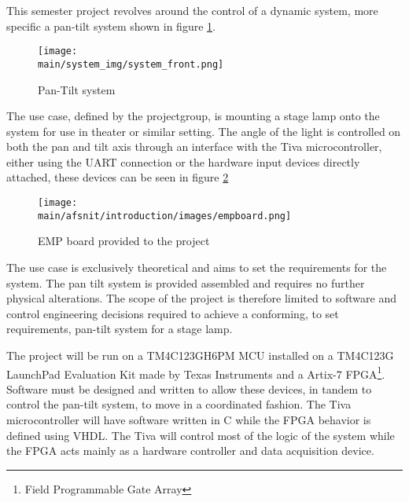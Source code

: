 \documentclass[../../main]{subfiles}
\begin{document}
This semester project revolves around the control of a dynamic system, more specific a pan-tilt  system shown in figure \ref{fig:system}.

\begin{figure}[H]
\centering
\texttt{[image: \\main/system\_img/system\_front.png]}
\caption{Pan-Tilt system}
\label{fig:system}
\end{figure}

The use case, defined by the projectgroup, is mounting a stage lamp onto the system for use in theater or similar setting.
The angle of the light is controlled on both the pan and tilt axis through an interface with the Tiva microcontroller, either using the UART connection or the hardware input devices directly attached, these devices can be seen in figure \ref{fig:empboard}

\begin{figure}[H]
\texttt{[image: \\main/afsnit/introduction/images/empboard.png]}
\caption{EMP board provided to the project}
\label{fig:empboard}
\end{figure}

The use case is exclusively theoretical and aims to set the requirements for the system.
The pan tilt system is provided assembled and requires no further physical alterations. The scope of the project is therefore limited to software and control engineering decisions required to achieve a conforming, to set requirements, pan-tilt system for a stage lamp.

The project will be run on a  TM4C123GH6PM MCU installed on a TM4C123G LaunchPad Evaluation Kit made by Texas Instruments and a Artix-7 FPGA\footnote{Field Programmable Gate Array}. Software must be designed and written to allow these devices, in tandem to control the pan-tilt system, to move in a coordinated fashion.
The Tiva microcontroller will have software written in C while the FPGA behavior is defined using VHDL. The Tiva will control most of the logic of the system while the FPGA acts mainly as a hardware controller and data acquisition device.
\end{document}
